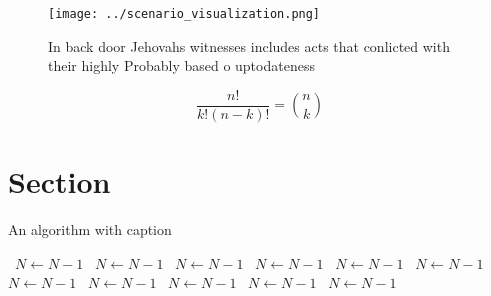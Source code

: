 \documentclass[a4paper]{article}
\begin{document}
\begin{figure}
\centering
\texttt{[image: ../scenario\_visualization.png]}
\caption{In back door Jehovahs witnesses includes acts that conlicted with their highly Probably based o uptodateness 
}
\end{figure}
 
\[ \frac{n!}{k!(n-k)!} = \binom{n}{k} \]

\section{Section}

\begin{algorithm}
\caption{An algorithm with caption}
\begin{algorithmic}
\    \State $N \gets N - 1$
\    \State $N \gets N - 1$
\    \State $N \gets N - 1$
\    \State $N \gets N - 1$
\    \State $N \gets N - 1$
\    \State $N \gets N - 1$
\    \State $N \gets N - 1$
\    \State $N \gets N - 1$
\    \State $N \gets N - 1$
\    \State $N \gets N - 1$
\    \State $N \gets N - 1$
\EndWhile
\end{algorithmic}
\end{algorithm}
\end{document}
